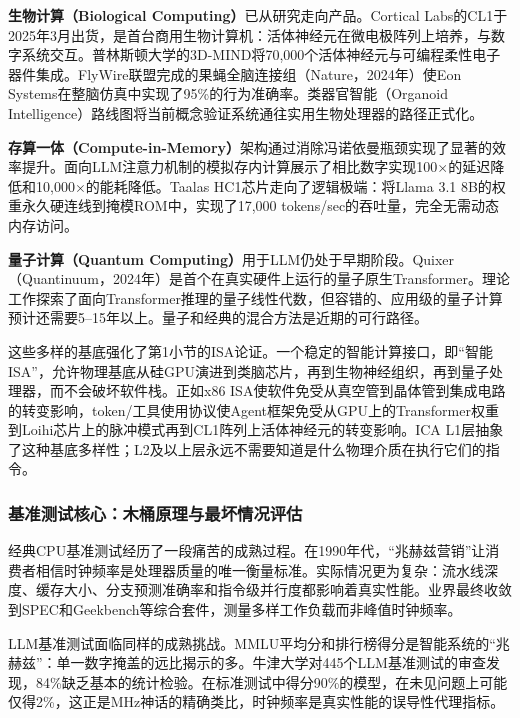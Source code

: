 \textbf{生物计算（Biological Computing）}已从研究走向产品。Cortical Labs的CL1于2025年3月出货，是首台商用生物计算机：活体神经元在微电极阵列上培养，与数字系统交互\cite{cortical_2025_cl1}。普林斯顿大学的3D-MIND将70,000个活体神经元与可编程柔性电子器件集成。FlyWire联盟完成的果蝇全脑连接组（Nature，2024年）使Eon Systems在整脑仿真中实现了95\%的行为准确率\cite{flywire_2024}。类器官智能（Organoid Intelligence）路线图将当前概念验证系统通往实用生物处理器的路径正式化\cite{hartung_2023_oi}。

\textbf{存算一体（Compute-in-Memory）}架构通过消除冯诺依曼瓶颈实现了显著的效率提升。面向LLM注意力机制的模拟存内计算展示了相比数字实现100$\times$的延迟降低和10,000$\times$的能耗降低。Taalas HC1芯片走向了逻辑极端：将Llama 3.1 8B的权重永久硬连线到掩模ROM中，实现了17,000 tokens/sec的吞吐量，完全无需动态内存访问\cite{taalas_2026_hc1}。

\textbf{量子计算（Quantum Computing）}用于LLM仍处于早期阶段。Quixer（Quantinuum，2024年）是首个在真实硬件上运行的量子原生Transformer\cite{khatri_2024_quixer}。理论工作探索了面向Transformer推理的量子线性代数\cite{guo_2024_quantum_transformer}，但容错的、应用级的量子计算预计还需要5--15年以上。量子和经典的混合方法是近期的可行路径。

这些多样的基底强化了第1小节的ISA论证。一个稳定的智能计算接口，即``智能ISA''，允许物理基底从硅GPU演进到类脑芯片，再到生物神经组织，再到量子处理器，而不会破坏软件栈。正如x86 ISA使软件免受从真空管到晶体管到集成电路的转变影响，token/工具使用协议使Agent框架免受从GPU上的Transformer权重到Loihi芯片上的脉冲模式再到CL1阵列上活体神经元的转变影响。ICA L1层抽象了这种基底多样性；L2及以上层永远不需要知道是什么物理介质在执行它们的指令。

\subsubsection{基准测试核心：木桶原理与最坏情况评估}

经典CPU基准测试经历了一段痛苦的成熟过程。在1990年代，``兆赫兹营销''让消费者相信时钟频率是处理器质量的唯一衡量标准。实际情况更为复杂：流水线深度、缓存大小、分支预测准确率和指令级并行度都影响着真实性能。业界最终收敛到SPEC和Geekbench等综合套件，测量多样工作负载而非峰值时钟频率\cite{spec_benchmark}。

LLM基准测试面临同样的成熟挑战。MMLU平均分和排行榜得分是智能系统的``兆赫兹''：单一数字掩盖的远比揭示的多。牛津大学对445个LLM基准测试的审查发现，84\%缺乏基本的统计检验\cite{fodor_2025_benchmarks}。在标准测试中得分90\%的模型，在未见问题上可能仅得2\%，这正是MHz神话的精确类比，时钟频率是真实性能的误导性代理指标。

